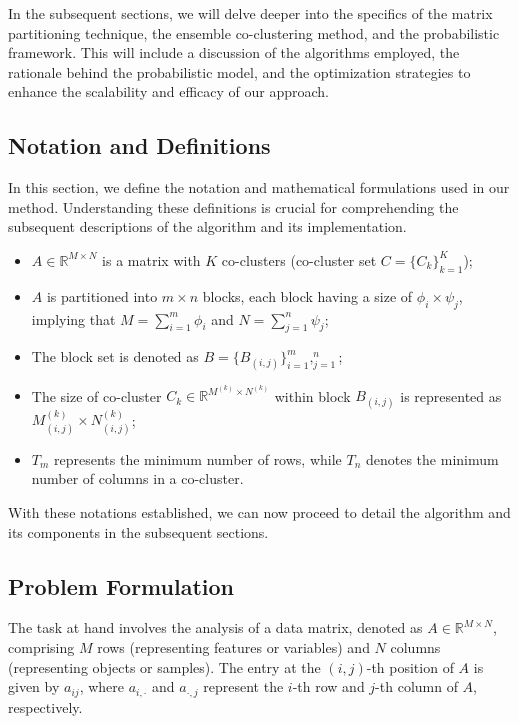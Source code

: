 In the subsequent sections, we will delve deeper into the specifics of the matrix partitioning technique, the ensemble co-clustering method, and the probabilistic framework. This will include a discussion of the algorithms employed, the rationale behind the probabilistic model, and the optimization strategies to enhance the scalability and efficacy of our approach.

\subsection{Notation and Definitions}
In this section, we define the notation and mathematical formulations used in our method. Understanding these definitions is crucial for comprehending the subsequent descriptions of the algorithm and its implementation.

\begin{itemize}
    \item $A \in \mathbb{R}^{M \times N}$ is a matrix with $K$ co-clusters (co-cluster set $C = \{C_k\}_{k=1}^K$);
    \item $A$ is partitioned into $m \times n$ blocks, each block having a size of $\phi_i \times \psi_j$, implying that $M=\sum_{i=1}^m \phi_i$ and $N=\sum_{j=1}^n \psi_j$;
    \item The block set is denoted as $B = \{B_{(i,j)}\}_{i=1}^m,_{j=1}^n$;
    \item The size of co-cluster $C_k \in \mathbb{R}^{M^{(k)} \times N^{(k)}}$ within block $B_{(i,j)}$ is represented as $M_{(i,j)}^{(k)} \times N_{(i,j)}^{(k)}$;
    \item $T_m$ represents the minimum number of rows, while $T_n$ denotes the minimum number of columns in a co-cluster.
\end{itemize}

With these notations established, we can now proceed to detail the algorithm and its components in the subsequent sections.

\subsection{Problem Formulation}
The task at hand involves the analysis of a data matrix, denoted as $A \in \mathbb{R}^{M \times N}$, comprising $M$ rows (representing features or variables) and $N$ columns (representing objects or samples). The entry at the $(i, j)$-th position of $A$ is given by $a_{ij}$, where $a_{i,\cdot}$ and $a_{\cdot,j}$ represent the $i$-th row and $j$-th column of $A$, respectively. 

